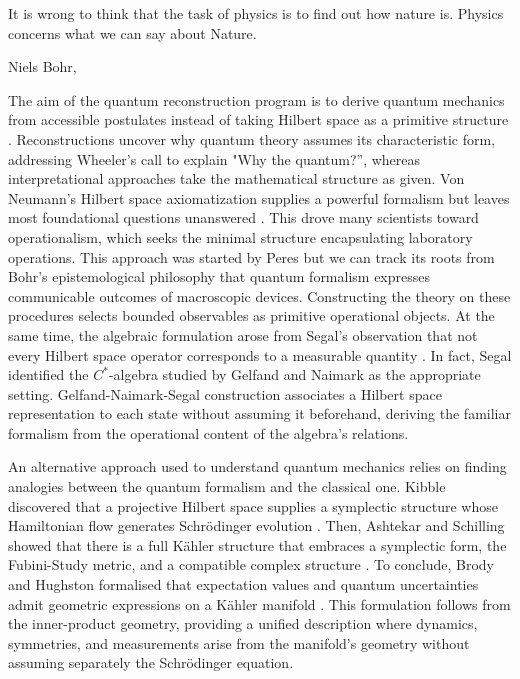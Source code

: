 \epigraph{It is wrong to think that the task of physics is to find out how nature is. Physics concerns what we can say about Nature.}{Niels Bohr, \cite{petersenPhilosophyNielsBohr1963}}

The aim of the quantum reconstruction program is to derive quantum mechanics from accessible postulates instead of taking Hilbert space as a primitive structure \cite{hardyQuantumTheoryFive2001}. Reconstructions uncover why quantum theory assumes its characteristic form, addressing Wheeler's call to explain "Why the quantum?'', whereas interpretational approaches take the mathematical structure as given. Von Neumann's Hilbert space axiomatization supplies a powerful formalism but leaves most foundational questions unanswered \cite{vonneumannMathematicalFoundationsQuantum2018}. This drove many scientists toward operationalism, which seeks the minimal structure encapsulating laboratory operations. This approach was started by Peres \cite{peresQuantumTheoryConcepts2002} but we can track its roots from Bohr's epistemological philosophy that quantum formalism expresses communicable outcomes of macroscopic devices. Constructing the theory on these procedures selects bounded observables as primitive operational objects. At the same time, the algebraic formulation arose from Segal's observation that not every Hilbert space operator corresponds to a measurable quantity \cite{segalIrreducibleRepresentationsOperator1947}. In fact, Segal identified the $C^*$-algebra studied by Gelfand and Naimark \cite{gelfandImbeddingNormedRings1994} as the appropriate setting. Gelfand-Naimark-Segal construction associates a Hilbert space representation to each state without assuming it beforehand, deriving the familiar formalism from the operational content of the algebra's relations.

An alternative approach used to understand quantum mechanics relies on finding analogies between the quantum formalism and the classical one. Kibble discovered that a projective Hilbert space supplies a symplectic structure whose Hamiltonian flow generates Schrödinger evolution \cite{kibbleGeometrizationQuantumMechanics1979}. Then, Ashtekar and Schilling showed that there is a full Kähler structure that embraces a symplectic form, the Fubini-Study metric, and a compatible complex structure \cite{ashtekarGeometricalFormulationQuantum1997}. To conclude, Brody and Hughston formalised that expectation values and quantum uncertainties admit geometric expressions on a Kähler manifold \cite{brodyGeometricQuantumMechanics2001}. This formulation follows from the inner-product geometry, providing a unified description where dynamics, symmetries, and measurements arise from the manifold's geometry without assuming separately the Schrödinger equation. 

